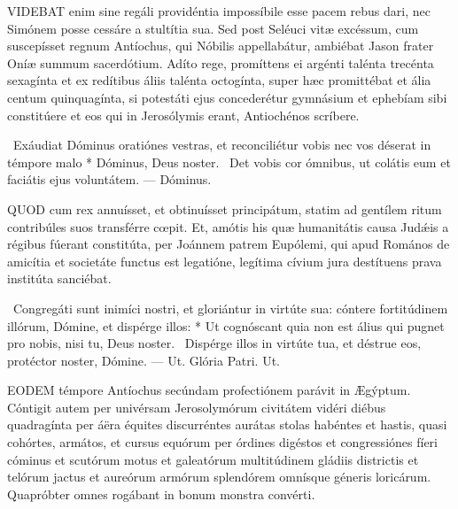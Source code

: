 
\lettrine[lines=2]{V}{IDEBAT} enim sine regáli providéntia impossíbile esse pacem rebus dari, nec Simónem posse cessáre a stultítia sua. Sed post Seléuci vitæ excéssum, cum suscepísset regnum Antíochus, qui Nóbilis appellabátur, ambiébat Jason frater Oníæ summum sacerdótium. Adíto rege, promíttens ei argénti talénta trecénta sexagínta et ex redítibus áliis talénta octogínta, super hæc promittébat et ália centum quinquagínta, si potestáti ejus concederétur gymnásium et ephebíam sibi constitúere et eos qui in Jerosólymis erant, Antiochénos scríbere.

\R\ Exáudiat Dóminus oratiónes vestras, et reconciliétur vobis nec vos déserat in témpore malo * Dóminus, Deus noster. \V\ Det vobis cor ómnibus, ut colátis eum et faciátis ejus voluntátem. — Dóminus.



\lettrine[lines=2]{Q}{UOD} cum rex annuísset, et obtinuísset principátum, statim ad gentílem ritum contribúles suos transférre cœpit. Et, amótis his quæ humanitátis causa Judǽis a régibus fúerant constitúta, per Joánnem patrem Eupólemi, qui apud Romános de amicítia et societáte functus est legatióne, legítima cívium jura destítuens prava institúta sanciébat.

\R\ Congregáti sunt inimíci nostri, et gloriántur in virtúte sua: cóntere fortitúdinem illórum, Dómine, et dispérge illos: * Ut cognóscant quia non est álius qui pugnet pro nobis, nisi tu, Deus noster. \V\ Dispérge illos in virtúte tua, et déstrue eos, protéctor noster, Dómine. — Ut. Glória Patri. Ut.




\lettrine[lines=2]{E}{ODEM} témpore Antíochus secúndam profectiónem parávit in Ægýptum. Cóntigit autem per univérsam Jerosolymórum civitátem vidéri diébus quadragínta per áëra équites discurréntes aurátas stolas habéntes et hastis, quasi cohórtes, armátos, et cursus equórum per órdines digéstos et congressiónes fíeri cóminus et scutórum motus et galeatórum multitúdinem gládiis districtis et telórum jactus et aureórum armórum splendórem omnísque géneris loricárum. Quapróbter omnes rogábant in bonum monstra convérti.


